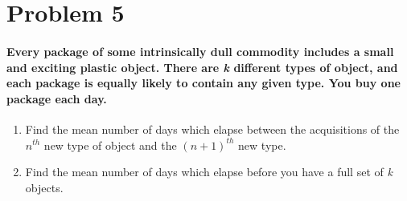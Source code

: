 \documentclass[12pt,letterpaper]{article}
\begin{document}

    \section*{Problem 5}
    \paragraph*{Every package of some intrinsically dull commodity includes a small and exciting plastic object. There are \textit{k} different types of object, and each package is equally likely to contain any given type. You buy one package each day.}
    
    \begin{enumerate}[label=(\alph*)]
        \item Find the mean number of days which elapse between the acquisitions of the $n^{th}$ new type of object and the $(n+1)^{th}$ new type.
        \item Find the mean number of days which elapse before you have a full set of \textit{k} objects.
    \end{enumerate}
    \vspace*{0.5cm}
\end{document}
